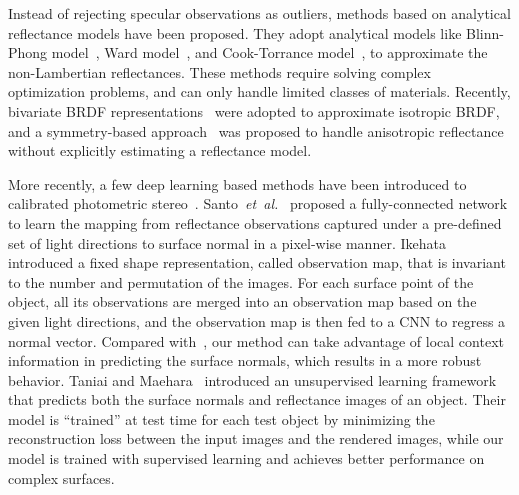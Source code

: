 \documentclass[10pt,journal,compsoc]{IEEEtran}
\newcommand{\etal}{\textit{et~al.}}
\newcommand{\rev}[1]{#1}
\begin{document}
\rev{Instead of rejecting specular observations as outliers, methods based on analytical reflectance models have been proposed. They adopt analytical models like Blinn-Phong model~\cite{tozza2016direct}, Ward model~\cite{chung2008efficient}, and Cook-Torrance model~\cite{ruiters2009heightfield}, to approximate the non-Lambertian reflectances.}
These methods require solving complex optimization problems, and can only handle limited classes of materials. Recently, bivariate BRDF representations~\cite{shi2014bi,ikehata2014p} were adopted to approximate isotropic BRDF, and a symmetry-based approach~\cite{holroyd2008photometric} was proposed to handle anisotropic reflectance without explicitly estimating a reflectance model. 

More recently, a few deep learning based methods have been introduced to calibrated photometric stereo~\cite{santo2017deep,Taniai18,ikehata2018cnn}. Santo~\etal~\cite{santo2017deep} proposed a fully-connected network to learn the mapping from reflectance observations captured under a pre-defined set of light directions to surface normal in a pixel-wise manner. 
Ikehata~\cite{ikehata2018cnn} introduced a fixed shape representation, called observation map, that is invariant to the number and permutation of the images. For each surface point of the object, all its observations are merged into an observation map based on the given light directions, and the observation map is then fed to a CNN to regress a normal vector. 
Compared with~\cite{santo2017deep,ikehata2018cnn}, our method can take advantage of local context information in predicting the surface normals, which results in a more robust behavior.
Taniai and Maehara~\cite{Taniai18} introduced an unsupervised learning framework that predicts both the surface normals and reflectance images of an object. Their model is ``trained'' at test time for each test object by minimizing the reconstruction loss between the input images and the rendered images, while our model is trained with supervised learning and achieves better performance on complex surfaces.
\end{document}

